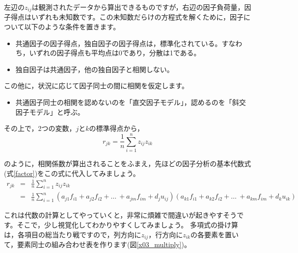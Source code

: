 \documentclass{ltjsbook}
\begin{document}
左辺の$z_{ij}$は観測されたデータから算出できるものですが，右辺の因子負荷量，因子得点はいずれも未知数です。この未知数だらけの方程式を解くために，因子について以下のような条件を置きます。
\begin{itemize}
	\item 共通因子の因子得点，独自因子の因子得点は，標準化されている。すなわち，いずれの因子得点も平均点は0であり，分散は1である。
	\item 独自因子は共通因子，他の独自因子と相関しない。
\end{itemize}
この他に，状況に応じて因子同士の間に相関を仮定します。
\begin{itemize}
	\item 共通因子同士の相関を認めないのを「直交因子モデル」，認めるのを「斜交因子モデル」と呼ぶ。
\end{itemize}

その上で，2つの変数，$j$と$k$の標準得点から，
\begin{equation}
	r_{jk}=\frac{1}{n} \sum_{i=1}^{n} z_{ij}z_{ik}
\end{equation}

のように，相関係数が算出されることをふまえ，先ほどの因子分析の基本代数式(式\ref{factor})をこの式に代入してみましょう。
\begin{equation}
	\begin{array}{ccl}
		r_{jk} & = & \displaystyle{\frac{1}{n} \sum_{i=1}^{n} z_{ij}z_{ik}}                                                                                                                  \\
		       & = & \displaystyle{\frac{1}{n} \sum_{i=1}^{n}}(a_{j1}f_{i1}+a_{j2}f_{i2}+ \ldots \ +a_{jm}f_{im}+d_{j}u_{ij})(a_{k1}f_{i1}+a_{k2}f_{i2}+ \ldots \ +a_{km}f_{im}+d_{k}u_{ik})
	\end{array}
\end{equation}

これは代数の計算としてやっていくと，非常に煩雑で間違いが起きやすそうです。そこで，少し視覚化してわかりやすくしてみましょう。
多項式の掛け算は，各項目の総当たり戦ですので，列方向に$z_{ij}$，行方向に$z_{ik}$の各要素を置いて，要素同士の組み合わせ表を作ります(図\ref{x03_multiply})。
\end{document}
